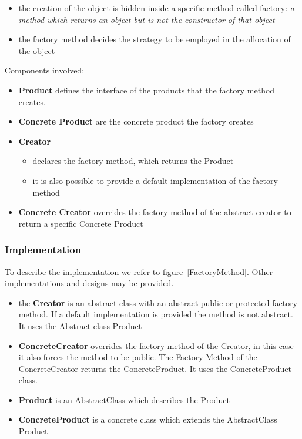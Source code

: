 \documentclass{article}
\begin{document}
\begin{itemize}
\item the creation of the object is hidden inside a specific method called factory: \emph{a method which returns an object but is not the constructor of that object}
\item the factory method decides the strategy to be employed in the allocation of the object
\end{itemize}


Components involved:

\begin{itemize}
\item  \textbf{Product} defines the interface of the products that the factory method creates.
\item \textbf{Concrete Product} are the concrete product the factory creates
\item  \textbf{Creator} 
\begin{itemize}
\item declares the factory method, which returns the Product
\item it is also possible to provide a default implementation of the factory method 
\end{itemize}
\item \textbf{Concrete Creator} overrides the factory method of the abstract creator to return a specific Concrete Product
\end{itemize}

\subsubsection{Implementation}
To describe the implementation we refer to figure~\ref{FactoryMethod}. Other implementations and designs may be provided.
\begin{itemize}
\item the \textbf{Creator} is an abstract class with an abstract public or protected factory method. If a default implementation is provided the method is not abstract. It uses the Abstract class Product
\item  \textbf{ConcreteCreator} overrides the factory method of the Creator, in this case it also forces the method to be public. The Factory Method of the ConcreteCreator returns the ConcreteProduct. It uses the ConcreteProduct class.
\item  \textbf{Product} is an AbstractClass which describes the Product
\item \textbf{ConcreteProduct} is a concrete class which extends the AbstractClass Product
\end{itemize}
\end{document}
